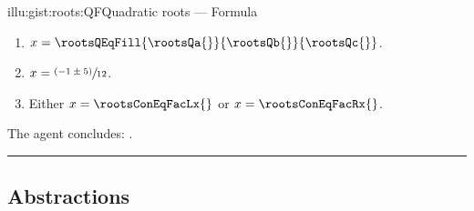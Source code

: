 \documentclass[10pt]{article}
\begin{document}
\begin{note}
\begin{minipage}{.5\linewidth}
\begin{rscenariox}{illu:gist:roots:QF}{Quadratic roots --- Formula}
\begin{enumerate}[label=\arabic*., ref=\arabic*]
      \item
        \label{illu:gist:roots:QF:qf-subs}
        \(x = \rootsQEqFill{\rootsQa{}}{\rootsQb{}}{\rootsQc{}}\).
      \item
        \label{illu:gist:roots:QF:qf:1}
        \(x = \sfrac{(- 1 \pm 5)}{12}\).
      \item
        \label{illu:gist:roots:QF:qf:done}
        Either \(x = \rootsConEqFacLx{}\) or \(x = \rootsConEqFacRx{}\).
      \end{enumerate}
      The agent concludes:
      \rootsCon{}.
    \end{rscenariox}
  \end{minipage}
  \par\noindent\rule{\textwidth}{0.4pt}
\end{note}

\begin{comment}
  \(a\) is the coefficient of the \(x^{2}\) term, \(b\) is the coefficient of the \(x\) term, and \(c\) is the constant.
\end{comment}

\begin{comment}
  \begin{itemize}
  \item
    In \autoref{illu:gist:roots:F} the agent does not conclude \propI{\rootsCon{}} from their understanding of the quadratic formula.
  \item
    In \autoref{illu:gist:roots:QF} the agent does not conclude \propI{\rootsCon{}} from their understanding of factorisation.
  \end{itemize}
\end{comment}

\subsection{Abstractions}

\begin{comment}
  Two distinct collections of abstraction.

  The first characterises inputs and outputs of reasoning.

  The second characterises relations between inputs and outputs of reasoning.
\end{comment}
\end{document}
